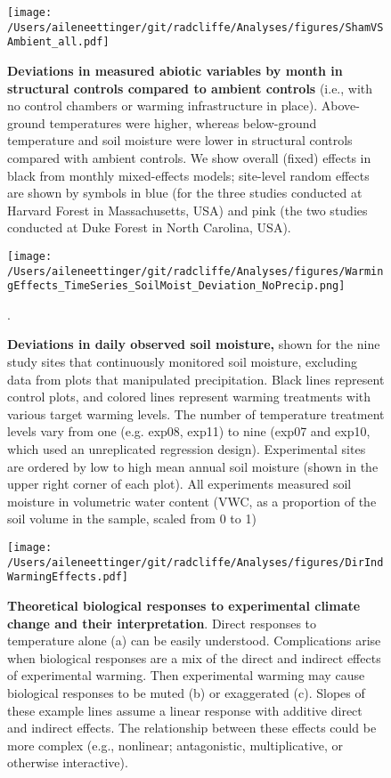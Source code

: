 \documentclass{article}
\begin{document}
 \begin{figure}[p]
\centering
 \texttt{[image: /Users/aileneettinger/git/radcliffe/Analyses/figures/ShamVSAmbient\_all.pdf]}  
 \caption{\textbf{Deviations in measured abiotic variables by month in structural controls compared to ambient controls} (i.e., with no control chambers or warming infrastructure in place). Above-ground temperatures were higher, whereas below-ground temperature and soil moisture were lower in structural controls compared with ambient controls. We show overall (fixed) effects in black from monthly mixed-effects models; site-level random effects are shown by symbols in blue (for the three studies conducted at Harvard Forest in Massachusetts, USA) and pink (the two studies conducted at Duke Forest in North Carolina, USA).}
 \label{fig:shamamb}
 \end{figure}
\clearpage
 \begin{figure}[h]
    \centering
 \texttt{[image: /Users/aileneettinger/git/radcliffe/Analyses/figures/WarmingEffects\_TimeSeries\_SoilMoist\_Deviation\_NoPrecip.png]}  
 \caption{\textbf{Deviations in daily observed soil moisture,} shown for the nine study sites that continuously monitored soil moisture, excluding data from plots that manipulated precipitation. Black lines represent control plots, and colored lines represent warming treatments with various target warming levels. The number of temperature treatment levels vary from one (e.g. exp08, exp11) to nine (exp07 and exp10, which used an unreplicated regression design).  Experimental sites are ordered by low to high mean annual soil moisture (shown in the upper right corner of each plot). All experiments measured soil moisture in volumetric water content (VWC, as a proportion of the soil volume in the sample, scaled from 0 to 1)}. 
 \label{fig:mois}
 \end{figure}
 
 \begin{figure}[h]
 \texttt{[image: /Users/aileneettinger/git/radcliffe/Analyses/figures/DirIndWarmingEffects.pdf]} 
 \caption{\textbf{Theoretical biological responses to experimental climate change and their interpretation}. Direct responses to temperature alone (a) can be easily understood. Complications arise when biological responses are a mix of the direct and indirect effects of experimental warming. Then experimental warming may cause biological responses to be muted (b) or exaggerated (c). Slopes of these example lines assume a linear response with additive direct and indirect effects. The relationship between these effects could be more complex (e.g., nonlinear; antagonistic, multiplicative, or otherwise interactive).} 
\label{fig:biolimp}
\end{figure}
\end{document}
